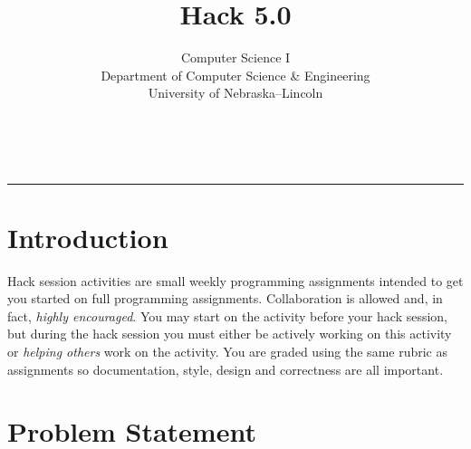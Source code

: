 \documentclass[12pt]{scrartcl}
\title{Hack 5.0}\let\Title\@title
\subtitle{Computer Science I\\
{\small
\vskip1cm
Department of Computer Science \& Engineering \\
University of Nebraska--Lincoln}
\vskip-1cm}
\date{~}
\begin{document}
\maketitle

\hrule

\section*{Introduction}

Hack session activities are small weekly programming assignments intended
to get you started on full programming assignments.  Collaboration is allowed
and, in fact, \emph{highly encouraged}.  You may start on the activity before
your hack session, but during the hack session you must either be actively 
working on this activity or \emph{helping others} work on the activity.
You are graded using the same rubric as assignments so documentation, style, 
design and correctness are all important.  

\section*{Problem Statement}
\end{document}
